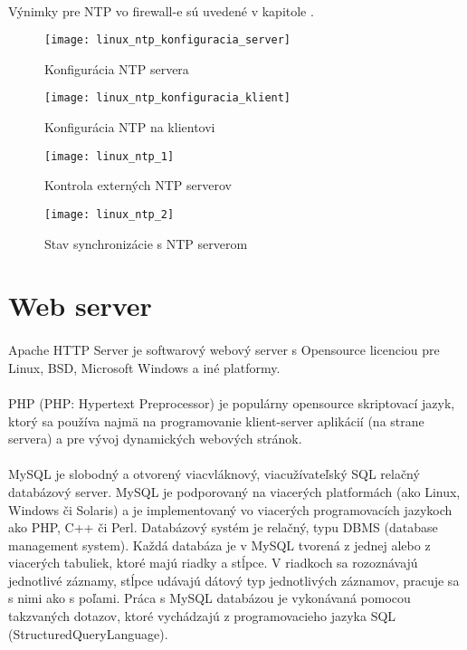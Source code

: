 \paragraph{}
Výnimky pre NTP vo firewall-e sú uvedené v kapitole .

\begin{figure}[!htb]
\centering
\texttt{[image: linux\_ntp\_konfiguracia\_server]}
\caption{Konfigurácia NTP servera}
\label{fig:ntp_config_server}
\end{figure}

\begin{figure}[!htb]
\centering
\texttt{[image: linux\_ntp\_konfiguracia\_klient]}
\caption{Konfigurácia NTP na klientovi}
\label{fig:ntp_config_client}
\end{figure}

\begin{figure}[!htb]
\centering
\texttt{[image: linux\_ntp\_1]}
\caption{Kontrola externých NTP serverov}
\label{fig:ntp_config_valid_1}
\end{figure}

\begin{figure}[!htb]
\centering
\texttt{[image: linux\_ntp\_2]}
\caption{Stav synchronizácie s NTP serverom}
\label{fig:ntp_config_valid_2}
\end{figure}

\section{Web server}
\paragraph{}
Apache HTTP Server je softwarový webový server s Opensource licenciou pre Linux, BSD, Microsoft Windows a iné platformy.
\paragraph{}
PHP (PHP: Hypertext Preprocessor) je populárny opensource skriptovací jazyk, ktorý sa používa najmä na programovanie klient-server aplikácií (na strane servera) a pre vývoj dynamických webových stránok.
\paragraph{}
MySQL je slobodný a otvorený viacvláknový, viacužívateľský SQL relačný databázový server. MySQL je podporovaný na viacerých platformách (ako Linux, Windows či Solaris) a je implementovaný vo viacerých programovacích jazykoch ako PHP, C++ či Perl. Databázový systém je relačný, typu DBMS (database management system). Každá databáza je v MySQL tvorená z jednej alebo z viacerých tabuliek, ktoré majú riadky a stĺpce. V riadkoch sa rozoznávajú jednotlivé záznamy, stĺpce udávajú dátový typ jednotlivých záznamov, pracuje sa s nimi ako s poľami. Práca s MySQL databázou je vykonávaná pomocou takzvaných dotazov, ktoré vychádzajú z programovacieho jazyka SQL (StructuredQueryLanguage).
